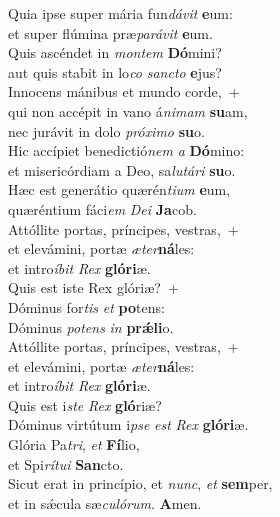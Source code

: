 \evenverse Quia ipse super mária fun\textit{dá}\textit{vit} \textbf{e}um:~\*\\
\evenverse et super flúmina præ\textit{pa}\textit{rá}\textit{vit} \textbf{e}um.\\
\oddverse Quis ascéndet in \textit{mon}\textit{tem} \textbf{Dó}mini?~\*\\
\oddverse aut quis stabit in lo\textit{co} \textit{san}\textit{cto} \textbf{e}jus?\\
\evenverse Innocens mánibus et mundo corde,~+\\
\evenverse  qui non accépit in vano á\textit{ni}\textit{mam} \textbf{su}am,~\*\\
\evenverse nec jurávit in dolo \textit{pró}\textit{xi}\textit{mo} \textbf{su}o.\\
\oddverse Hic accípiet benedictió\textit{nem} \textit{a} \textbf{Dó}mino:~\*\\
\oddverse et misericórdiam a Deo, sa\textit{lu}\textit{tá}\textit{ri} \textbf{su}o.\\
\evenverse Hæc est generátio quærén\textit{ti}\textit{um} \textbf{e}um,~\*\\
\evenverse quæréntium fáci\textit{em} \textit{De}\textit{i} \textbf{Ja}cob.\\
\oddverse Attóllite portas, príncipes, vestras,~+\\
\oddverse  et elevámini, portæ \textit{æ}\textit{ter}\textbf{ná}les:~\*\\
\oddverse et intro\textit{í}\textit{bit} \textit{Rex} \textbf{gló}\textbf{ri}æ.\\
\evenverse Quis est iste Rex glóriæ?~+\\
\evenverse  Dóminus for\textit{tis} \textit{et} \textbf{po}tens:~\*\\
\evenverse Dóminus \textit{po}\textit{tens} \textit{in} \textbf{prǽ}\textbf{li}o.\\
\oddverse Attóllite portas, príncipes, vestras,~+\\
\oddverse  et elevámini, portæ \textit{æ}\textit{ter}\textbf{ná}les:~\*\\
\oddverse et intro\textit{í}\textit{bit} \textit{Rex} \textbf{gló}\textbf{ri}æ.\\
\evenverse Quis est i\textit{ste} \textit{Rex} \textbf{gló}riæ?~\*\\
\evenverse Dóminus virtútum i\textit{pse} \textit{est} \textit{Rex} \textbf{gló}\textbf{ri}æ.\\
\oddverse Glória Pa\textit{tri}, \textit{et} \textbf{Fí}lio,~\*\\
\oddverse et Spi\textit{rí}\textit{tu}\textit{i} \textbf{San}cto.\\
\evenverse Sicut erat in princípio, et \textit{nunc}, \textit{et} \textbf{sem}per,~\*\\
\evenverse et in sǽcula sæ\textit{cu}\textit{ló}\textit{rum}. \textbf{A}men.\\
